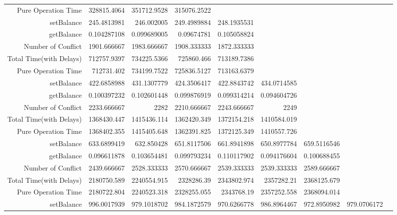 \begin{landscape}
\begin{table}[htbp]
\begin{tabular}{rrrrrrrrr}
    Pure Operation Time & 328815.4064 & 351712.9528 & 315076.2522 &       &       &       &       &  \\
\cline{1-9}     
    setBalance & 245.4813981 & 246.002005 & 249.4989884 & 248.1935531 &       &       &       &  \\
    getBalance & 0.104287108 & 0.099689005 & 0.09674781 & 0.105058824 &       &       &       &  \\
    Number of Conflict & 1901.666667 & 1983.666667 & 1908.333333 & 1872.333333 &       &       &       &  \\
    Total Time(with Delays) & 712757.9397 & 734225.5366 & 725860.466 & 713189.7386 &       &       &       &  \\
    Pure Operation Time & 712731.402 & 734199.7522 & 725836.5127 & 713163.6379 &       &       &       &  \\    
    \cline{1-9} 
    setBalance & 422.6858988 & 431.1307779 & 424.3506417 & 422.8843742 & 434.0714585 &       &       &  \\
    getBalance & 0.100397232 & 0.102601448 & 0.099876919 & 0.099314214 & 0.094604726 &       &       &  \\
    Number of Conflict & 2233.666667 & 2282  & 2210.666667 & 2243.666667 & 2249  &       &       &  \\
    Total Time(with Delays) & 1368430.447 & 1415436.114 & 1362420.349 & 1372154.218 & 1410584.019 &       &       &  \\
    Pure Operation Time & 1368402.355 & 1415405.648 & 1362391.825 & 1372125.349 & 1410557.726 &       &       &  \\
\cline{1-9}     
    setBalance & 633.6899419 & 632.850428 & 651.8117506 & 661.8941898 & 650.8977784 & 659.5116546 &       &  \\
    getBalance & 0.096611878 & 0.103654481 & 0.099793234 & 0.110117902 & 0.094176604 & 0.100688455 &       &  \\
    Number of Conflict & 2439.666667 & 2528.333333 & 2570.666667 & 2539.333333 & 2539.333333 & 2589.666667 &       &  \\
    Total Time(with Delays) & 2180750.589 & 2240554.915 & 2328286.39 & 2343802.974 & 2357282.21 & 2368125.679 &       &  \\
    Pure Operation Time & 2180722.804 & 2240523.318 & 2328255.055 & 2343768.19 & 2357252.558 & 2368094.014 &       &  \\
\cline{1-9}     
    setBalance & 996.0017939 & 979.1018702 & 984.1872579 & 970.6266778 & 986.8964467 & 972.8950982 & 979.0706172 &  \\

\end{tabular}
\end{table}
\end{landscape}
